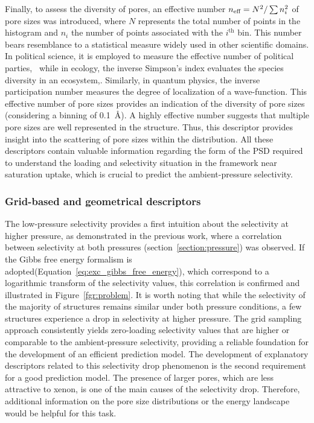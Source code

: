 \documentclass[main]{subfiles}
\begin{document}
Finally, to assess the diversity of pores, an effective number $n_{\text{eff}} = N^2/\sum n_i^2$ of pore sizes was introduced, where $N$ represents the total number of points in the histogram and $n_i$ the number of points associated with the $i^\text{th}$ bin. This number bears resemblance to a statistical measure widely used in other scientific domains. In political science, it is employed to measure the effective number of political parties,~\autocite{neffposci_Laakso1979} while in ecology, the inverse Simpson's index evaluates the species diversity in an ecosystem,\autocite{neffbio_Simpson1949}. Similarly, in quantum physics, the inverse participation number measures the degree of localization of a wave-function.\autocite{neffphys_Kramer1993} This effective number of pore sizes provides an indication of the diversity of pore sizes (considering a binning of \SI{0.1}{\angstrom}). A highly effective number suggests that multiple pore sizes are well represented in the structure. Thus, this descriptor provides insight into the scattering of pore sizes within the distribution.
All these descriptors contain valuable information regarding the form of the PSD required to understand the loading and selectivity situation in the framework near saturation uptake, which is crucial to predict the ambient-pressure selectivity.

\subsubsection{Grid-based and geometrical descriptors}

The low-pressure selectivity provides a first intuition about the selectivity at higher pressure, as demonstrated in the previous work, where a correlation between selectivity at both pressures (section~\ref{section:pressure}) was observed. If the Gibbs free energy formalism is adopted(Equation~\ref{eq:exc_gibbs_free_energy}), which correspond to a logarithmic transform of the selectivity values, this correlation is confirmed and illustrated in Figure~\ref{fgr:problem}. It is worth noting that while the selectivity of the majority of structures remains similar under both pressure conditions, a few structures experience a drop in selectivity at higher pressure. The grid sampling approach consistently yields zero-loading selectivity values that are higher or comparable to the ambient-pressure selectivity, providing a reliable foundation for the development of an efficient prediction model. The development of explanatory descriptors related to this selectivity drop phenomenon is the second requirement for a good prediction model. The presence of larger pores, which are less attractive to xenon, is one of the main causes of the selectivity drop. Therefore, additional information on the pore size distributions or the energy landscape would be helpful for this task.
\end{document}
